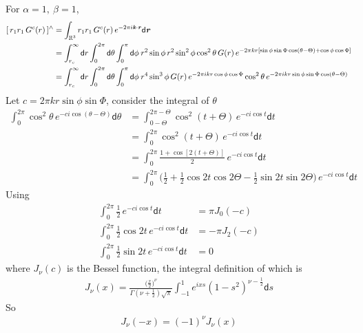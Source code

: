 \documentclass[aps,pre,preprint,unsortedaddress]{revtex4}
\renewcommand{\v}[1]{\textbf{\textit{#1}}}
\renewcommand{\d}[1]{\textsf{#1}}
\begin{document}
For $\alpha = 1,\ \beta = 1$,
\begin{align}\nonumber
  [\,r_1r_1\,G^c(r)\,]^{\wedge} 
  &= \int_{\mathbb R^3} r_1r_1\,G^c(r)\, e^{-2\pi i\v k\cdot\v r}\d d\v r \\\nonumber
  &= \int_{r_c}^\infty \d dr \int_{0}^{2\pi} \d d\theta \int_0^\pi\d d\phi\:
  r^2\sin\phi \,r^2 \sin^2\phi\cos^2\theta\,G(r)\,
  e^{-2\pi k r[\sin\phi\sin\Phi\cos(\theta - \Theta) + \cos\phi\cos\Phi]} \\
  &= \int_{r_c}^\infty \d dr \int_{0}^{2\pi} \d d\theta \int_0^\pi\d d\phi\:
  r^4\sin^3\phi\,G(r)\,e^{-2\pi i kr\cos\phi\cos\Phi}
  \cos^2\theta\,e^{-2\pi i kr\sin\phi\sin\Phi\cos(\theta- \Theta)}
\end{align}
Let $c = 2\pi kr\sin\phi\sin\Phi$, consider the integral of $\theta$
\begin{align}\nonumber
  \int_0^{2\pi} \cos^2\theta\,e^{-ci\cos(\theta - \Theta)}\d d\theta
  & =
  \int_{0-\Theta}^{2\pi-\Theta} \cos^2(t + \Theta) \, e^{-ci\cos t}\d dt \\\nonumber
  & = 
  \int_0^{2\pi}\cos^2(t + \Theta)\, e^{-ci\cos t} \d dt \\\nonumber
  & = 
  \int_0^{2\pi}\frac{1 + \cos[2(t + \Theta)]}2 \, e^{-ci\cos t} \d dt \\\nonumber  
  & = 
  \int_0^{2\pi}
  \Big(
  \frac12 + \frac12\cos 2t\cos 2\Theta - \frac12\sin 2t\sin 2\Theta
  \Big)
  \, e^{-ci\cos t} \d d t
\end{align}
Using
\begin{align}\label{eqn:tmp31}
  \int_0^{2\pi} \frac12 \,e^{-ci\cos t}\d dt &= \pi J_0(-c) \\\label{eqn:tmp32}
  \int_0^{2\pi} \frac12\cos 2t \,e^{-ci\cos t}\d dt &= -\pi J_2(-c) \\\label{eqn:tmp33}
  \int_0^{2\pi} \frac12\sin 2t \,e^{-ci\cos t}\d dt &= 0 
\end{align}
where $J_\nu(c)$ is the Bessel function, the integral definition of which is
\begin{align}
  J_\nu(x) =
  \frac
  {\big({\frac x2}\big)^\nu}
  {\Gamma(\nu + \frac12)\sqrt\pi}
  \int_{-1}^1e^{ixs}(1-s^2)^{\nu-\frac12}\d ds
\end{align}
So
\begin{align}
  J_\nu(-x) = (-1)^\nu J_\nu(x)
\end{align}
\end{document}
